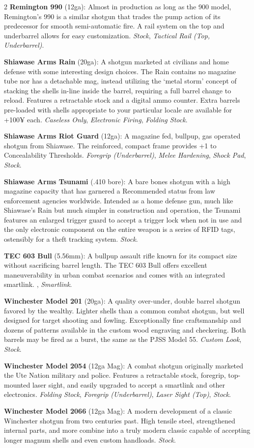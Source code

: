 \documentclass[
  oneside]{article}
\begin{document}
\begin{multicols}{2}
\textbf{Remington 990} (12ga): Almost in
production as long as the 900 model, Remington's
990 is a similar shotgun that trades the pump
action of its predecessor for smooth
semi-automatic fire. A rail system on the top and
underbarrel allows for easy customization.
\emph{Stock}, \emph{Tactical Rail (Top,
Underbarrel)}.

\textbf{Shiawase Arms Rain} (20ga): A shotgun
marketed at civilians and home defense with some
interesting design choices. The Rain contains no
magazine tube nor has a detachable mag, instead
utilizing the `metal storm' concept of stacking
the shells in-line inside the barrel, requiring a
full barrel change to reload. Features a
retractable stock and a digital ammo counter.
Extra barrels pre-loaded with shells appropriate
to your particular locale are available for +100¥
each. \emph{Caseless Only}, \emph{Electronic
Firing}, \emph{Folding Stock}.

\textbf{Shiawase Arms Riot Guard} (12ga): A
magazine fed, bullpup, gas operated shotgun from
Shiawase. The reinforced, compact frame provides
+1 to Concealability Thresholds. \emph{Foregrip
(Underbarrel)}, \emph{Melee Hardening},
\emph{Shock Pad}, \emph{Stock}.

\textbf{Shiawase Arms Tsunami} (.410 bore): A bare
bones shotgun with a high magazine capacity that
has garnered a Recommended status from law
enforcement agencies worldwide. Intended as a home
defense gun, much like Shiawase's Rain but much
simpler in construction and operation, the Tsunami
features an enlarged trigger guard to accept a
trigger lock when not in use and the only
electronic component on the entire weapon is a
series of RFID tags, ostensibly for a theft
tracking system. \emph{Stock}.

\textbf{TEC 603 Bull} (5.56mm): A bullpup assault
rifle known for its compact size without
sacrificing barrel length. The TEC 603 Bull offers
excellent maneuverability in urban combat
scenarios and comes with an integrated smartlink.
, \emph{Smartlink}.

\textbf{Winchester Model 201} (20ga): A quality
over-under, double barrel shotgun favored by the
wealthy. Lighter shells than a common combat
shotgun, but well designed for target shooting and
fowling. Exceptionally fine craftsmanship and
dozens of patterns available in the custom wood
engraving and checkering. Both barrels may be
fired as a burst, the same as the PJSS Model 55.
\emph{Custom Look}, \emph{Stock}.

\textbf{Winchester Model 2054} (12ga Mag): A
combat shotgun originally marketed the Ute Nation
military and police. Features a retractable stock,
foregrip, top-mounted laser sight, and easily
upgraded to accept a smartlink and other
electronics. \emph{Folding Stock}, \emph{Foregrip
(Underbarrel)}, \emph{Laser Sight (Top)},
\emph{Stock}.

\textbf{Winchester Model 2066} (12ga Mag): A
modern development of a classic Winchester shotgun
from two centuries past. High tensile steel,
strengthened internal parts, and more combine into
a truly modern classic capable of accepting longer
magnum shells and even custom handloads.
\emph{Stock}.

\end{multicols}
\end{document}
